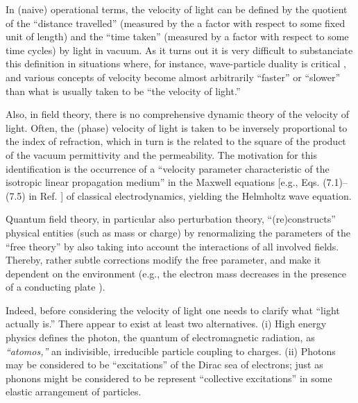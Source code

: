 \documentclass[%
 reprint,
 showpacs,
 showkeys,
 preprintnumbers,
 amsmath,amssymb,
 aps,
 prl,
  longbibliography,
 ]{revtex4-1}
\theoremstyle{definition}
\theoremstyle{remark}
\begin{document}
In (naive) operational terms, the velocity of light
can be defined by the quotient of the ``distance travelled''
(measured by the a factor with respect to some fixed unit of length)
and the ``time taken''
(measured by a factor with respect to some time cycles)
by light in vacuum.
As it turns out it is very difficult to substanciate this definition
in situations where, for instance,
wave-particle duality is critical \cite{PhysRevA.48.R34,Chiao:02},
and various concepts of velocity become almost arbitrarily ``faster''
or ``slower'' than what is usually taken to be ``the velocity of light.''

Also, in field theory,
there is no comprehensive dynamic theory of the velocity of light.
Often, the (phase) velocity of light is taken to be inversely proportional
to the index of refraction, which in turn
is the related to the square of the product of the vacuum permittivity and the permeability.
The motivation for this identification is the occurrence of a
``velocity parameter characteristic of the isotropic linear propagation medium''
in the Maxwell equations [e.g., Eqs. (7.1)--(7.5) in Ref. \cite{jackson}] of classical electrodynamics,
yielding the Helmholtz wave equation.

Quantum field theory, in particular also perturbation theory,
``(re)constructs'' physical entities (such as mass or charge) by renormalizing
the parameters of the ``free theory'' by also taking into account the interactions
of all involved fields. Thereby, rather subtle corrections modify the free parameter,
and make it dependent on the environment
(e.g., the electron mass decreases in the presence of a conducting plate
\cite{PhysRevD.34.1429}).

Indeed, before considering the velocity of light one needs to clarify what ``light actually is.''
There appear to exist at least two alternatives.
(i) High energy physics defines the photon, the quantum of electromagnetic radiation,
as {\it ``atomos,''} an indivisible, irreducible particle
\cite[p. 27]{PhysRevD.86.010001} coupling to charges.
(ii) Photons may be considered to be ``excitations'' of the Dirac sea of electrons;
just as phonons might be considered to be represent ``collective excitations'' in some
elastic arrangement of particles.
\end{document}

